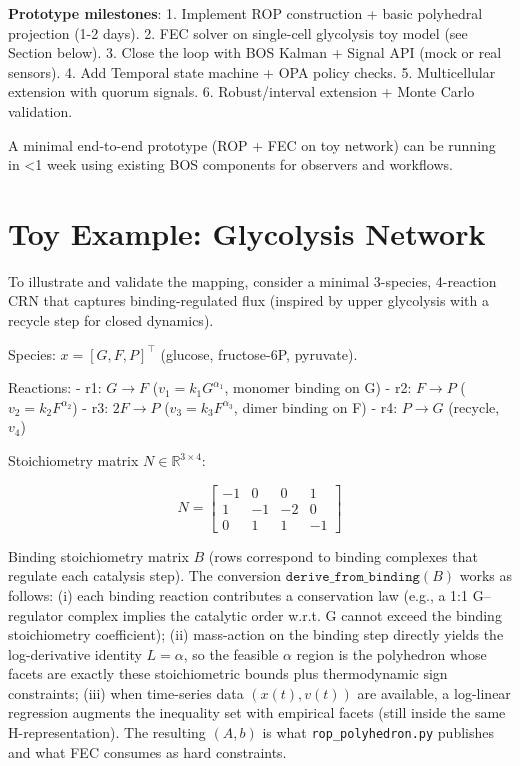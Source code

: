 \documentclass[11pt,a4paper]{article}
\begin{document}
\textbf{Prototype milestones}:
1. Implement ROP construction + basic polyhedral projection (1-2 days).
2. FEC solver on single-cell glycolysis toy model (see Section below).
3. Close the loop with BOS Kalman + Signal API (mock or real sensors).
4. Add Temporal state machine + OPA policy checks.
5. Multicellular extension with quorum signals.
6. Robust/interval extension + Monte Carlo validation.

A minimal end-to-end prototype (ROP + FEC on toy network) can be running in <1 week using existing BOS components for observers and workflows.

\section{Toy Example: Glycolysis Network}

To illustrate and validate the mapping, consider a minimal 3-species, 4-reaction CRN that captures binding-regulated flux (inspired by upper glycolysis with a recycle step for closed dynamics).

Species: \( x = [G, F, P]^\top \) (glucose, fructose-6P, pyruvate).

Reactions:
- r1: \( G \to F \) (\(v_1 = k_1 G^{\alpha_1}\), monomer binding on G)
- r2: \( F \to P \) (\(v_2 = k_2 F^{\alpha_2}\))
- r3: \( 2F \to P \) (\(v_3 = k_3 F^{\alpha_3}\), dimer binding on F)
- r4: \( P \to G \) (recycle, \(v_4\))

Stoichiometry matrix \( N \in \mathbb{R}^{3\times 4} \):

\[
N = \begin{bmatrix}
-1 &  0 &  0 &  1 \\
 1 & -1 & -2 &  0 \\
 0 &  1 &  1 & -1
\end{bmatrix}
\]

Binding stoichiometry matrix \( B \) (rows correspond to binding complexes that regulate each catalysis step). The conversion \(\texttt{derive\_from\_binding}(B)\) works as follows: (i) each binding reaction contributes a conservation law (e.g., a 1:1 G--regulator complex implies the catalytic order w.r.t. G cannot exceed the binding stoichiometry coefficient); (ii) mass-action on the binding step directly yields the log-derivative identity \(L = \alpha\), so the feasible \(\alpha\) region is the polyhedron whose facets are exactly these stoichiometric bounds plus thermodynamic sign constraints; (iii) when time-series data \((x(t), v(t))\) are available, a log-linear regression augments the inequality set with empirical facets (still inside the same H-representation). The resulting \((A, b)\) is what \texttt{rop\_polyhedron.py} publishes and what FEC consumes as hard constraints.
\end{document}
